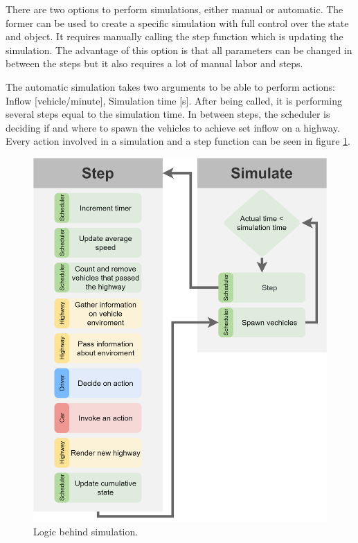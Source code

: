 There are two options to perform simulations, either manual or automatic. The former can be used to create a specific simulation with full control over the state and object. It requires manually calling the step function which is updating the simulation. The advantage of this option is that all parameters can be changed in between the steps but it also requires a lot of manual labor and steps.

The automatic simulation takes two arguments to be able to perform actions: Inflow [vehicle/minute], Simulation time [s]. After being called, it is performing several steps equal to the simulation time. In between steps, the scheduler is deciding if and where to spawn the vehicles to achieve set inflow on a highway. Every action involved in a simulation and a step function can be seen in figure \ref{fig:sim-steps}.

\begin{figure}[H]
    \centering
    \includegraphics[width= \linewidth]{images/simulation-steps.png}
    \caption{Logic behind simulation.}
    \label{fig:sim-steps}
\end{figure}

